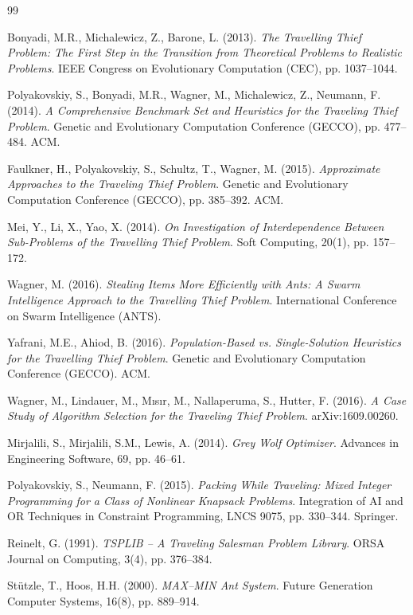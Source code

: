 \documentclass[12pt,a4paper]{article}
\begin{document}
\begin{thebibliography}{99}

Bonyadi, M.R., Michalewicz, Z., Barone, L. (2013).
\textit{The Travelling Thief Problem: The First Step in the Transition from Theoretical Problems to Realistic Problems}.
IEEE Congress on Evolutionary Computation (CEC), pp. 1037--1044.

Polyakovskiy, S., Bonyadi, M.R., Wagner, M., Michalewicz, Z., Neumann, F. (2014).
\textit{A Comprehensive Benchmark Set and Heuristics for the Traveling Thief Problem}.
Genetic and Evolutionary Computation Conference (GECCO), pp. 477--484. ACM.

Faulkner, H., Polyakovskiy, S., Schultz, T., Wagner, M. (2015).
\textit{Approximate Approaches to the Traveling Thief Problem}.
Genetic and Evolutionary Computation Conference (GECCO), pp. 385--392. ACM.

Mei, Y., Li, X., Yao, X. (2014).
\textit{On Investigation of Interdependence Between Sub-Problems of the Travelling Thief Problem}.
Soft Computing, 20(1), pp. 157--172.

Wagner, M. (2016).
\textit{Stealing Items More Efficiently with Ants: A Swarm Intelligence Approach to the Travelling Thief Problem}.
International Conference on Swarm Intelligence (ANTS).

Yafrani, M.E., Ahiod, B. (2016).
\textit{Population-Based vs. Single-Solution Heuristics for the Travelling Thief Problem}.
Genetic and Evolutionary Computation Conference (GECCO). ACM.

Wagner, M., Lindauer, M., M\i{}s\i{}r, M., Nallaperuma, S., Hutter, F. (2016).
\textit{A Case Study of Algorithm Selection for the Traveling Thief Problem}.
arXiv:1609.00260.

Mirjalili, S., Mirjalili, S.M., Lewis, A. (2014).
\textit{Grey Wolf Optimizer}.
Advances in Engineering Software, 69, pp. 46--61.

Polyakovskiy, S., Neumann, F. (2015).
\textit{Packing While Traveling: Mixed Integer Programming for a Class of Nonlinear Knapsack Problems}.
Integration of AI and OR Techniques in Constraint Programming, LNCS 9075, pp. 330--344. Springer.

Reinelt, G. (1991).
\textit{TSPLIB -- A Traveling Salesman Problem Library}.
ORSA Journal on Computing, 3(4), pp. 376--384.

St{\"u}tzle, T., Hoos, H.H. (2000).
\textit{MAX--MIN Ant System}.
Future Generation Computer Systems, 16(8), pp. 889--914.

\end{thebibliography}
\end{document}
